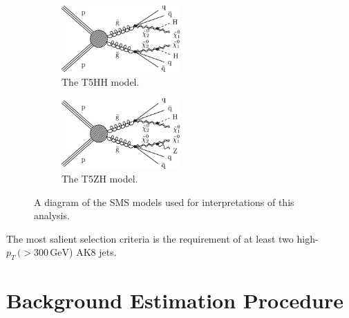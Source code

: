 \begin{figure}[htbp]

\begin{subfigure}[b]{0.5\textwidth}
\centering
\includegraphics[width=0.5\textwidth]{figs/CMS-SUS-17-006_Figure_001.pdf}
\caption{The T5HH model.}
\end{subfigure}

\begin{subfigure}[b]{0.5\textwidth}
\centering
\includegraphics[width=0.5\textwidth]{figs/CMS-SUS-17-006_Figure-aux_001.pdf}
\caption{The T5ZH model.}
\end{subfigure}

\caption{A diagram of the SMS models used for interpretations of this analysis.}
\label{fig:sms}
\end{figure}

The most salient selection criteria is the requirement of at least two high-$p_{T}\,(>300\,\mathrm{GeV}$) AK8 jets.

\section{Background Estimation Procedure}

